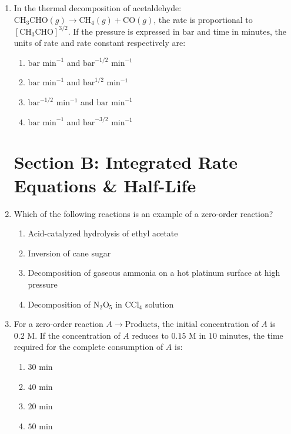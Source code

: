 \documentclass[11pt, a4paper]{article}
\begin{document}
\begin{enumerate}
\item In the thermal decomposition of acetaldehyde: $\text{CH}_3\text{CHO}(g) \rightarrow \text{CH}_4(g) + \text{CO}(g)$, the rate is proportional to $[\text{CH}_3\text{CHO}]^{3/2}$. If the pressure is expressed in $\text{bar}$ and time in $\text{minutes}$, the units of rate and rate constant respectively are:
\begin{enumerate}
    \item $\text{bar min}^{-1}$ and $\text{bar}^{-1/2}\text{ min}^{-1}$
    \item $\text{bar min}^{-1}$ and $\text{bar}^{1/2}\text{ min}^{-1}$
    \item $\text{bar}^{-1/2}\text{ min}^{-1}$ and $\text{bar min}^{-1}$
    \item $\text{bar min}^{-1}$ and $\text{bar}^{-3/2}\text{ min}^{-1}$
\end{enumerate}

\section*{Section B: Integrated Rate Equations \& Half-Life}

\item Which of the following reactions is an example of a zero-order reaction?
\begin{enumerate}
    \item Acid-catalyzed hydrolysis of ethyl acetate
    \item Inversion of cane sugar
    \item Decomposition of gaseous ammonia on a hot platinum surface at high pressure
    \item Decomposition of $\text{N}_2\text{O}_5$ in $\text{CCl}_4$ solution
\end{enumerate}

\item For a zero-order reaction $A \rightarrow \text{Products}$, the initial concentration of $A$ is $0.2\text{ M}$. If the concentration of $A$ reduces to $0.15\text{ M}$ in $10\text{ minutes}$, the time required for the complete consumption of $A$ is:
\begin{enumerate}
    \item $30\text{ min}$
    \item $40\text{ min}$
    \item $20\text{ min}$
    \item $50\text{ min}$
\end{enumerate}


\end{enumerate}
\end{document}

